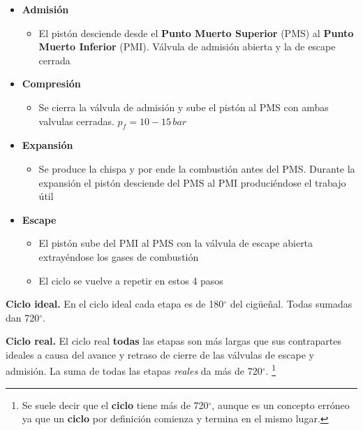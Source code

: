 \begin{itemize}
    \item {\bf Admisión}
    \begin{itemize}
        \item El pistón desciende desde el \textbf{Punto Muerto Superior} (PMS) al \textbf{Punto Muerto Inferior} (PMI). Válvula de admisión abierta y la de escape cerrada
    \end{itemize}
    \item \textbf{Compresión}
    \begin{itemize}
        \item Se cierra la válvula de admisión y sube el pistón al PMS con ambas valvulas cerradas. $p_f=10-15\,bar$
    \end{itemize}
    \item  \textbf{Expansión}
    \begin{itemize}
        \item Se produce la chispa y por ende la combustión antes del PMS. Durante la expansión el pistón desciende del PMS al PMI produciéndose el trabajo útil
    \end{itemize}
    \item \textbf{Escape}
    \begin{itemize}
        \item El pistón sube del PMI al PMS con la válvula de escape abierta extrayéndose los gases de combustión
        \item El ciclo se vuelve a repetir en estos 4 pasos
    \end{itemize}
\end{itemize}
\textbf{Ciclo ideal.} En el ciclo ideal cada etapa es de 180$^\circ$ del cigüeñal. Todas sumadas dan 720$^\circ$.

\textbf{Ciclo real.} El ciclo real \textbf{todas} las etapas son más largas que sus contrapartes ideales a causa del avance y retraso de cierre de las válvulas de escape y admisión. La suma de todas las etapas \textit{reales} da más de 720$^\circ$. \footnote{Se suele decir que el \textbf{ciclo} tiene más de 720$^\circ$, aunque es un concepto erróneo ya que un \textbf{ciclo} por definición comienza y termina en el mismo lugar.}

